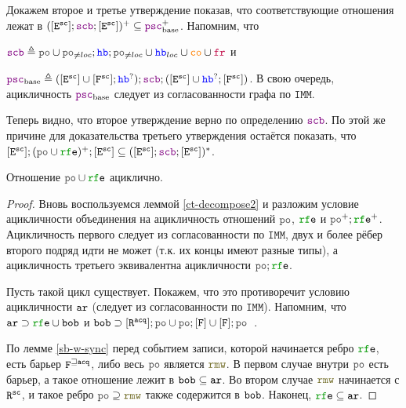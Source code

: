 \documentclass[14pt]{matmex-diploma-custom}
\newcommand{\Rsc}{\lR^{\sco}}
\newcommand{\IMM}{\mathtt{IMM}}
\begin{document}
Докажем второе и третье утверждение показав, что соответствующие отношения лежат в $([\lE^\sco] ; \lSCB ; [\lE^\sco])^{+} \subseteq \lPSCB^{+}$. Напомним, что

$\lSCB \defeq \lPO \cup \lPO_{\neq loc} ; \lHB ; \lPO_{\neq loc} \cup \lHB_{loc} \cup \lCO \cup \lFR$ и

$\lPSCB \defeq ([\lE^\sco] \cup [\lF^\sco];\lHB^?);\lSCB;([\lE^\sco] \cup{} \lHB^?;[\lF^\sco])$. В свою очередь, ацикличность $\lPSCB$ следует из согласованности графа по $\IMM$. 

Теперь видно, что второе утверждение верно по определению $\lSCB$. По этой же причине для доказательства третьего утверждения остаётся показать, что $[\lE^{\sco}];(\lPO \cup \lRFE)^{+} ; [\lE^{\sco}] \subseteq ([\lE^\sco] ; \lSCB ; [\lE^\sco])^{*}$. 


\begin{theorem} \label{acyclic-po-rfe}
Отношение $\lPO \cup \lRFE$ ациклично.
\end{theorem}
\begin{proof}
Вновь воспользуемся леммой \ref{ct-decompose2} и разложим условие ацикличности объединения на ацикличность отношений $\lPO$, $\lRFE$ и $\lPO^{+} ; \lRFE^{+}$. Ацикличность первого следует из согласованности по $\IMM$, двух и более рёбер второго подряд идти не может (т.к. их концы имеют разные типы), а ацикличность третьего эквивалентна ацикличности $\lPO ; \lRFE$. 

  Пусть такой цикл существует. Покажем, что это противоречит условию ацикличности $\lAR$ (следует из согласованности по $\IMM$). Напомним, что $\lAR \supset \lRFE \cup \lBOB$ и $\lBOB \supset [\lR^{\acq}] ; \lPO \cup \lPO ; [\lF] \cup [\lF] ; \lPO$\ .

  По лемме \ref{sb-w-sync} перед событием записи, которой начинается ребро $\lRFE$, есть барьер ${\mathtt{F}}^{\sqsupseteq {\mathtt{acq}}}$, либо весь $\lPO$ является $\lRMW$. В первом случае внутри $\lPO$ есть барьер, а такое отношение лежит в $\lBOB \subseteq \lAR$. Во втором случае $\lRMW$ начинается с $\Rsc$, и такое ребро $\lPO \supseteq \lRMW$ также содержится в ${\mathtt{bob}}$. Наконец, $\lRFE \subseteq \lAR$. 
\end{proof}
\end{document}
